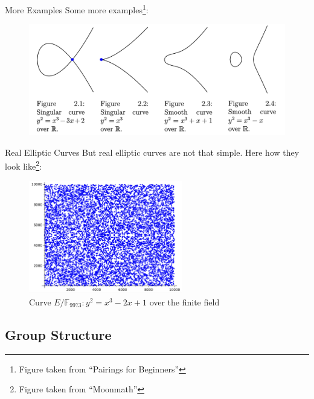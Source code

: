 \documentclass{beamer}
\begin{document}
    \begin{frame}{More Examples}
        Some more examples\footnote{Figure taken from ``Pairings for Beginners''}:
        \begin{figure}
            \centering
            \includegraphics[width=\textwidth]{images/lecture_3/ec_illustration_2.png}
            \label{fig:ec_2}
        \end{figure}
    \end{frame}

    \begin{frame}{Real Elliptic Curves}
        But real elliptic curves are not that simple. Here how they look like\footnote{Figure taken from ``Moonmath''}:
        \begin{figure}
            \centering
            \includegraphics[width=0.6\textwidth]{images/lecture_3/ec_illustration_3.png}
            \caption{Curve $E/\mathbb{F}_{9973}: y^2 = x^3-2x+1$ over the finite field}
            \label{fig:ec_3}
        \end{figure}
    \end{frame}

    \subsection{Group Structure}
\end{document}
